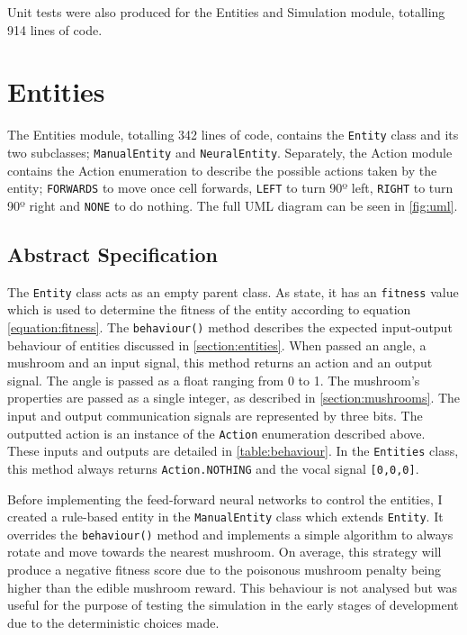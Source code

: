\documentclass[12pt,a4paper]{report}
\begin{document}
Unit tests were also produced for the Entities and Simulation module, totalling 914 lines of code.

\section{Entities}

The Entities module, totalling 342 lines of code, contains the \texttt{Entity} class and its two subclasses; \texttt{ManualEntity} and \texttt{NeuralEntity}. Separately, the Action module contains the Action enumeration to describe the possible actions taken by the entity; \texttt{FORWARDS} to move once cell forwards, \texttt{LEFT} to turn 90º left, \texttt{RIGHT} to turn 90º right and \texttt{NONE} to do nothing. The full UML diagram can be seen in \cref{fig:uml}.

\subsection{Abstract Specification}

The \texttt{Entity} class acts as an empty parent class. As state, it has an \texttt{fitness} value which is used to determine the fitness of the entity according to equation \ref{equation:fitness}. The \texttt{behaviour()} method describes the expected input-output behaviour of entities discussed in \cref{section:entities}. When passed an angle, a mushroom and an input signal, this method returns an action and an output signal. The angle is passed as a float ranging from 0 to 1. The mushroom's properties are passed as a single integer, as described in \cref{section:mushrooms}. The input and output communication signals are represented by three bits. The outputted action is an instance of the \texttt{Action} enumeration described above. These inputs and outputs are detailed in \cref{table:behaviour}. In the \texttt{Entities} class, this method always returns \texttt{Action.NOTHING} and the vocal signal \texttt{[0,0,0]}.


Before implementing the feed-forward neural networks to control the entities, I created a rule-based entity in the \texttt{ManualEntity} class which extends \texttt{Entity}. It overrides the \texttt{behaviour()} method and implements a simple algorithm to always rotate and move towards the nearest mushroom. On average, this strategy will produce a negative fitness score due to the poisonous mushroom penalty being higher than the edible mushroom reward. This behaviour is not analysed but was useful for the purpose of testing the simulation in the early stages of development due to the deterministic choices made.
\end{document}
